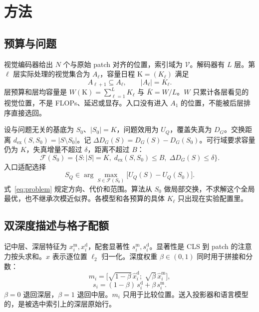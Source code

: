 \section{方法}
\label{sec:method}

\subsection{预算与问题}
\label{sec:problem}

视觉编码器给出 $N$ 个与原始 patch 对齐的位置，索引域为 $\mathcal{V}$。解码器有 $L$ 层。第 $\ell$ 层实际处理的视觉集合为 $A_\ell$，容量日程 $\mathrm{K}=(K_\ell)$ 满足
\begin{equation}
A_{\ell+1}\subseteq A_\ell,\qquad |A_\ell|=K_\ell.
\label{eq:nest}
\end{equation}
层预算和层均容量是 $W(\mathrm{K})=\sum_{\ell=1}^{L}K_\ell$ 与 $\bar K=W/L$。$W$ 只累计各层看见的视觉位置，不是 FLOPs、延迟或显存。入口没有进入 $A_1$ 的位置，不能被后层排序直接选回。

设与问题无关的基底为 $S_0$、$|S_0|=K$，问题效用为 $U_Q$，覆盖失真为 $D_G$。交换距离 $d_{\mathrm{ex}}(S,S_0)=|S\setminus S_0|$。记 $\Delta D_G(S)=D_G(S)-D_G(S_0)$。可行域要求容量仍为 $K$，失真增量不超过 $\delta$，距离不超过 $B$：
\begin{equation}
\mathcal{F}(S_0)=\{S:|S|=K,\; d_{\mathrm{ex}}(S,S_0)\le B,\; \Delta D_G(S)\le\delta\}.
\label{eq:feasible}
\end{equation}
入口适配选择
\begin{equation}
S_Q\in\arg\max_{S\in\mathcal{F}(S_0)}\bigl[U_Q(S)-U_Q(S_0)\bigr].
\label{eq:problem}
\end{equation}
式~\eqref{eq:problem} 规定方向、代价和范围。算法从 $S_0$ 做局部交换，不求解这个全局最优，也不继承次模近似界。各模型和各预算的具体 $K_\ell$ 只出现在实验配置里。

\subsection{双深度描述与格子配额}
\label{sec:dual}

记中层、深层特征为 $x_i^{\mathrm{m}},x_i^{\mathrm{d}}$，配套显著性 $s_i^{\mathrm{m}},s_i^{\mathrm{d}}$。显著性是 CLS 到 patch 的注意力按头求和。$\hat x$ 表示逐位置 $\ell_2$ 归一化。深度权重 $\beta\in(0,1)$ 同时用于拼接和分数：
\begin{equation}
m_i=\bigl[\sqrt{1-\beta}\,\hat x_i^{\mathrm{d}};\;\sqrt{\beta}\,\hat x_i^{\mathrm{m}}\bigr],
\label{eq:desc}
\end{equation}
\begin{equation}
s_i=(1-\beta)\,s_i^{\mathrm{d}}+\beta\,s_i^{\mathrm{m}}.
\label{eq:sal}
\end{equation}
$\beta=0$ 退回深层，$\beta=1$ 退回中层。$m_i$ 只用于比较位置。送入投影器和语言模型的，是被选中索引上的深层原始行。

